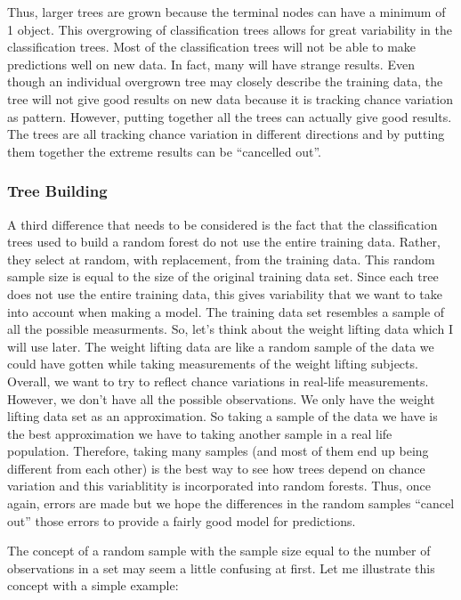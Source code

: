 \documentclass[12pt,twoside]{reedthesis}
\begin{document}
  Thus, larger trees are grown because the terminal nodes can have a
  minimum of 1 object. This overgrowing of classification trees allows for
  great variability in the classification trees. Most of the
  classification trees will not be able to make predictions well on new
  data. In fact, many will have strange results. Even though an individual
  overgrown tree may closely describe the training data, the tree will not
  give good results on new data because it is tracking chance variation as
  pattern. However, putting together all the trees can actually give good
  results. The trees are all tracking chance variation in different
  directions and by putting them together the extreme results can be
  ``cancelled out''.
  
  \subsubsection{Tree Building}\label{tree-building}
  
  A third difference that needs to be considered is the fact that the
  classification trees used to build a random forest do not use the entire
  training data. Rather, they select at random, with replacement, from the
  training data. This random sample size is equal to the size of the
  original training data set. Since each tree does not use the entire
  training data, this gives variability that we want to take into account
  when making a model. The training data set resembles a sample of all the
  possible measurments. So, let's think about the weight lifting data
  which I will use later. The weight lifting data are like a random sample
  of the data we could have gotten while taking measurements of the weight
  lifting subjects. Overall, we want to try to reflect chance variations
  in real-life measurements. However, we don't have all the possible
  observations. We only have the weight lifting data set as an
  approximation. So taking a sample of the data we have is the best
  approximation we have to taking another sample in a real life
  population. Therefore, taking many samples (and most of them end up
  being different from each other) is the best way to see how trees depend
  on chance variation and this variablitity is incorporated into random
  forests. Thus, once again, errors are made but we hope the differences
  in the random samples ``cancel out'' those errors to provide a fairly
  good model for predictions.
  
  The concept of a random sample with the sample size equal to the number
  of observations in a set may seem a little confusing at first. Let me
  illustrate this concept with a simple example:
  
\end{document}
